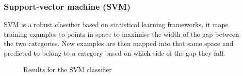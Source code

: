 \subsubsection{Support-vector machine (SVM)}
SVM is a robust classifier based on statistical learning frameworks, it maps training examples to points in space to maximise the width of the gap between the two categories. New examples are then mapped into that same space and predicted to belong to a category based on which side of the gap they fall.
\begin{figure}[H]
    \centering
    \caption{Results for the SVM classifier}
    \label{fig:SVMResults}
\end{figure}

